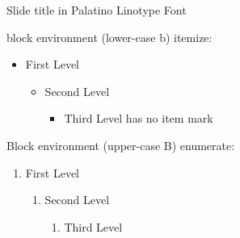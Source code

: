 \documentclass[10pt,aspectratio=43]{beamer}
\begin{document}
	
	
	\begin{frame}{Slide title in Palatino Linotype Font}
		\begin{block}{block environment (lower-case b)}
			itemize:
			\begin{itemize}
				\item First Level
				\begin{itemize}
					\item Second Level
					\begin{itemize}
						\item Third Level has no item mark
					\end{itemize}
				\end{itemize}
			\end{itemize}
		\end{block}
		\begin{Block}{Block environment (upper-case B)}
			enumerate:
			\begin{enumerate}
				\item First Level
				\begin{enumerate}
					\item Second Level
					\begin{enumerate}
						\item Third Level
					\end{enumerate}
				\end{enumerate}
			\end{enumerate}
		\end{Block}
	\end{frame}
\end{document}
